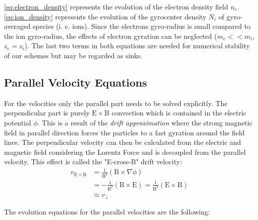 \documentclass[master.tex]{subfiles}
\begin{document}
\autoref{eq:electron_density} represents the evolution of the electron density field $n_e$.
\autoref{eq:ion_density} represents the evolution of the gyrocenter density $N_i$ of gyro-averaged species (i. e. ions). Since the electrons gyro-radius is small compared to the ion gyro-radius, the effects of electron gyration can be neglected ($m_e << m_i$, $z_e = z_i$). \newline
The last two terms in both equations are needed for numerical stability of our schemes but may be regarded as sinks.


\subsection{Parallel Velocity Equations}
For the velocities only the parallel part needs to be solved explicitly. The perpendicular part is purely $\mathrm{E}\times \mathrm{B}$ convection which is contained in the electric potential $\phi$. This is a result of the \textit{drift approximation} where the strong magnetic field in parallel direction forces the particles to a fast gyration around the field lines. The perpendicular velocity can then be calculated from the electric and magnetic field considering the Lorentz Force and is decoupled from the parallel velocity. This effect is called the "E-cross-B" drift velocity:
\begin{align}
    v_{\mathrm{E}\times\mathrm{B}} &= \frac{1}{\mathrm{B}^2} (\mathrm{B} \times \nabla \phi) \\
    &= - \frac{1}{\mathrm{B}^2} (\mathrm{B} \times \mathrm{E}) = \frac{1}{\mathrm{B}^2} (\mathrm{E} \times \mathrm{B}) \\
    &\approx v_\perp
\end{align}

The evolution equations for the parallel velocities are the following:
\end{document}
